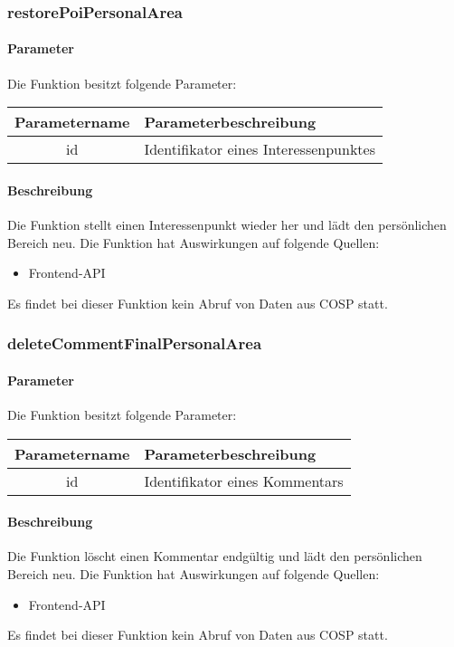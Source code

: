 \subsubsection{restorePoiPersonalArea}
\paragraph{Parameter} Die Funktion besitzt folgende Parameter:
\begin{table}[H]
	\begin{tabular}{|c|p{11cm}|}
		\hline
		\textbf{Parametername} & \textbf{Parameterbeschreibung} \\ \hline
		id & Identifikator eines Interessenpunktes \\ \hline
	\end{tabular}
\end{table}
\paragraph{Beschreibung} Die Funktion stellt einen Interessenpunkt wieder her und lädt den persönlichen Bereich neu. Die Funktion hat Auswirkungen auf folgende Quellen:
\begin{itemize}
	\item Frontend-API
\end{itemize}
Es findet bei dieser Funktion kein Abruf von Daten aus {\glqq COSP\grqq} statt.
\subsubsection{deleteCommentFinalPersonalArea}
\paragraph{Parameter} Die Funktion besitzt folgende Parameter:
\begin{table}[H]
	\begin{tabular}{|c|p{11cm}|}
		\hline
		\textbf{Parametername} & \textbf{Parameterbeschreibung} \\ \hline
		id & Identifikator eines Kommentars \\ \hline
	\end{tabular}
\end{table}
\paragraph{Beschreibung} Die Funktion löscht einen Kommentar endgültig und lädt den persönlichen Bereich neu. Die Funktion hat Auswirkungen auf folgende Quellen:
\begin{itemize}
	\item Frontend-API
\end{itemize}
Es findet bei dieser Funktion kein Abruf von Daten aus {\glqq COSP\grqq} statt.
